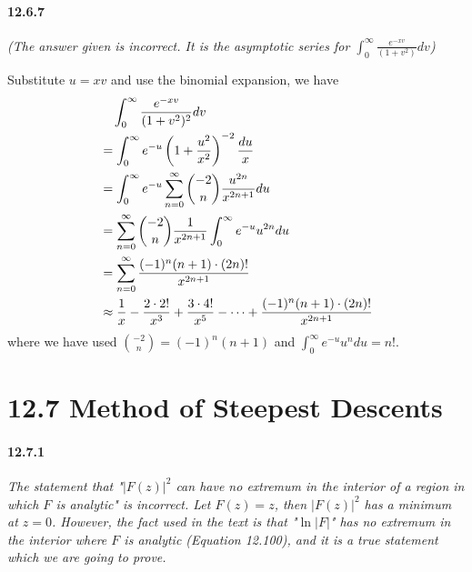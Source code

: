 \documentclass[a4paper]{article}
\begin{document}
\paragraph{12.6.7}
\textit{(The answer given is incorrect. It is the asymptotic series for $\int_0^\infty\frac{e^{-xv}}{(1+v^2)}dv$)}

Substitute $u=xv$ and use the binomial expansion, we have
\begin{equation*}
\begin{split}
    & \quad\int_0^\infty\frac{e^{-xv}}{(1+v^2)^2}dv \\
    & =\int_0^\infty e^{-u}\left(1+\frac{u^2}{x^2} \right)^{-2}\frac{du}{x}\\
    & =\int_0^\infty e^{-u}\sum_{n=0}^\infty\binom{-2}{n}\frac{u^{2n}}{x^{2n+1}}du\\
    & =\sum_{n=0}^\infty\binom{-2}{n}\frac{1}{x^{2n+1}}\int_0^\infty e^{-u}u^{2n}du\\
    & =\sum_{n=0}^\infty\frac{(-1)^n(n+1)\cdot(2n)!}{x^{2n+1}}\\
    & \approx\frac{1}{x}-\frac{2\cdot2!}{x^{3}}+\frac{3\cdot4!}{x^5}-\cdots+\frac{(-1)^n(n+1)\cdot(2n)!}{x^{2n+1}}
\end{split}
\end{equation*}
where we have used $\binom{-2}{n}=(-1)^n(n+1)$ and $\int_0^\infty e^{-u}u^ndu=n!$.

\section*{12.7 Method of Steepest Descents}
\paragraph{12.7.1}
\textit {The statement that "$|F(z)|^2$ can have no extremum in the interior of a region in which $F$ is analytic" is incorrect. Let $F(z)=z$, then $|F(z)|^2$ has a minimum at $z=0$. However, the fact used in the text is that "$\ln|F|$" has no extremum in the interior where $F$ is analytic (Equation 12.100), and it is a true statement which we are going to prove.}
\end{document}
